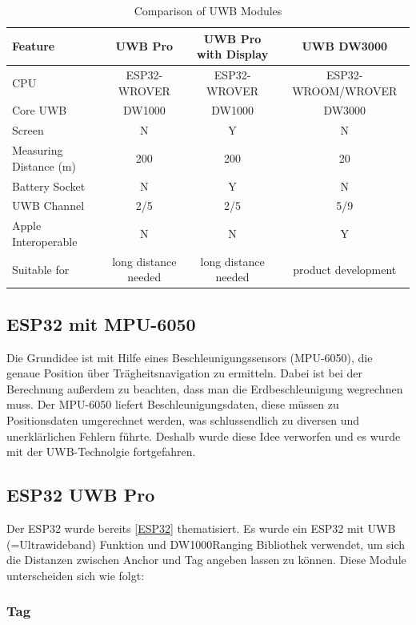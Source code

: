 \begin{table}[h]
	\centering
	\small
	\begin{tabular}{|l|c|c|c|}
		\hline
		\textbf{Feature} & \textbf{UWB Pro} & \textbf{UWB Pro with Display} & \textbf{UWB DW3000} \\
		\hline
		CPU & ESP32-WROVER & ESP32-WROVER & ESP32-WROOM/WROVER \\
		\hline
		Core UWB & DW1000 & DW1000 & DW3000 \\
		\hline
		Screen & N & Y & N \\
		\hline
		Measuring Distance (m) & 200 & 200 & 20 \\
		\hline
		Battery Socket & N & Y & N \\
		\hline
		UWB Channel & 2/5 & 2/5 & 5/9 \\
		\hline
		Apple Interoperable & N & N & Y \\
		\hline
		Suitable for & long distance needed & long distance needed & product development \\
		\hline
	\end{tabular}
	\caption{Comparison of UWB Modules}
	\label{tab:uwb_comparison}
	\parencite{ArtenSensorn}
\end{table}

\subsection{ESP32 mit MPU-6050}
Die Grundidee ist mit Hilfe eines Beschleunigungssensors (MPU-6050), die genaue Position über Trägheitsnavigation zu ermitteln. Dabei ist bei der Berechnung außerdem zu beachten, dass man die Erdbeschleunigung wegrechnen muss. Der MPU-6050 liefert Beschleunigungsdaten, diese müssen zu Positionsdaten umgerechnet werden, was schlussendlich zu diversen und unerklärlichen Fehlern führte. Deshalb wurde diese Idee verworfen und es wurde mit der UWB-Technolgie fortgefahren. \parencite{MPU6050}

\subsection{ESP32 UWB Pro}

Der ESP32 wurde bereits \ref{ESP32} thematisiert. Es wurde ein ESP32 mit UWB (=Ultrawideband) Funktion und DW1000Ranging Bibliothek verwendet, um sich die Distanzen zwischen Anchor und Tag angeben lassen zu können. Diese Module unterscheiden sich wie folgt:

\subsubsection{Tag}

